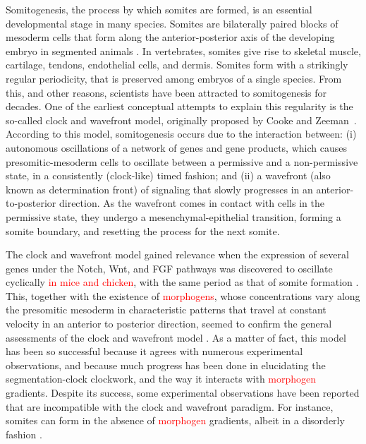 \documentclass[%
 preprint,
 aip, 
 amsmath,amssymb,
]{revtex4-2}
\begin{document}
Somitogenesis, the process by which somites are formed, is an essential developmental stage in many species. Somites are bilaterally paired blocks of mesoderm cells that form along the anterior-posterior axis of the developing embryo in segmented animals \cite{Maroto2012}. In vertebrates, somites give rise to skeletal muscle, cartilage, tendons, endothelial cells, and dermis. Somites form with a strikingly regular periodicity, that is preserved among embryos of a single species. From this, and other reasons, scientists have been attracted to somitogenesis for decades. One of the earliest conceptual attempts to explain this regularity is the so-called clock and wavefront model, originally proposed by Cooke and Zeeman~\cite{Cooke1976}. According to this model, somitogenesis occurs due to the interaction between: (i) autonomous oscillations of a network of genes and gene products, which causes presomitic-mesoderm cells to oscillate between a permissive and a non-permissive state, in a consistently (clock-like) timed fashion; and (ii) a wavefront (also known as determination front) of signaling that slowly progresses in an anterior-to-posterior direction. As the wavefront comes in contact with cells in the permissive state, they undergo a mesenchymal-epithelial transition, forming a somite boundary, and resetting the process for the next somite.
	
The clock and wavefront model gained relevance when the expression of several genes under the Notch, Wnt, and FGF pathways was discovered to oscillate cyclically \textcolor{red}{in mice and chicken}, with the same period as that of somite formation \cite{Palmeirim1997, Pourquie2001, Gibb2010, Pourquie2011}. This, together with the existence of \textcolor{red}{morphogens}, whose concentrations vary along the presomitic mesoderm in characteristic patterns that travel at constant velocity in an anterior to posterior direction, seemed to confirm the general assessments of the clock and wavefront model \cite{Gibb2010, Pourquie2011, Dubrulle2001}. As a matter of fact, this model has been so successful because it agrees with numerous experimental observations, and because much progress has been done in elucidating the segmentation-clock clockwork, and the way it interacts with \textcolor{red}{morphogen} gradients. Despite its success, some experimental observations have been reported that are incompatible with the clock and wavefront paradigm. For instance, somites can form in the absence of \textcolor{red}{morphogen} gradients, albeit in a disorderly fashion \cite{Naiche2011,Dias2014}.
	
\end{document}
